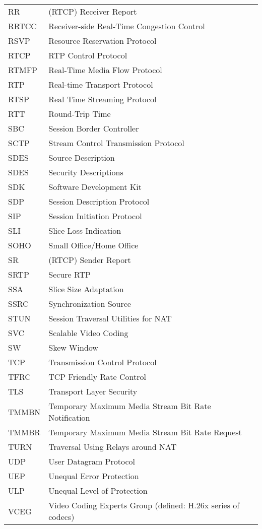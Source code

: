 \begin{longtable}{ll}
RR  	& (RTCP) Receiver Report \\
RRTCC	& Receiver-side Real-Time Congestion Control \\
RSVP 	& Resource Reservation Protocol \\
RTCP 	& RTP Control Protocol \\
RTMFP	& Real-Time Media Flow Protocol \\
RTP 	& Real-time Transport Protocol \\
RTSP 	& Real Time Streaming Protocol \\
RTT 	& Round-Trip Time \\
SBC  	& Session Border Controller \\
SCTP 	& Stream Control Transmission Protocol \\
SDES 	& Source Description \\
SDES 	& Security Descriptions \\
SDK  	& Software Development Kit \\
SDP 	& Session Description Protocol \\
SIP 	& Session Initiation Protocol \\
SLI 	& Slice Loss Indication \\
SOHO 	& Small Office/Home Office \\
SR  	& (RTCP) Sender Report \\
SRTP 	& Secure RTP \\
SSA 	& Slice Size Adaptation \\
SSRC 	& Synchronization Source \\
STUN 	& Session Traversal Utilities for NAT \\
SVC 	& Scalable Video Coding \\
SW  	& Skew Window \\
TCP 	& Transmission Control Protocol \\
TFRC 	& TCP Friendly Rate Control \\
TLS 	& Transport Layer Security \\
TMMBN 	& Temporary Maximum Media Stream Bit Rate Notification \\
TMMBR 	& Temporary Maximum Media Stream Bit Rate Request \\
TURN 	& Traversal Using Relays around NAT \\
UDP 	& User Datagram Protocol \\
UEP 	& Unequal Error Protection \\
ULP 	& Unequal Level of Protection \\
VCEG 	& Video Coding Experts Group (defined: H.26x series of codecs)\\

\end{longtable}
